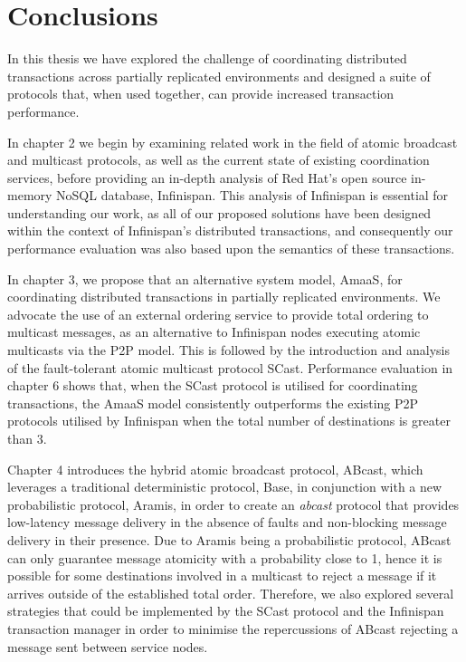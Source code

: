 \chapter{Conclusions}

    \graphicspath{{Chapter7-Conclusions/Figs/Vector/}{Chapter3-Conclusions/Figs/}}

In this thesis we have explored the challenge of coordinating distributed transactions across partially replicated environments and designed a suite of protocols that, when used together, can provide increased transaction performance. 

In chapter 2 we begin by examining related work in the field of atomic broadcast and multicast protocols, as well as the current state of existing coordination services, before providing an in-depth analysis of Red Hat's open source in-memory NoSQL database, Infinispan.  This analysis of Infinispan is essential for understanding our work, as all of our proposed solutions have been designed within the context of Infinispan's distributed transactions, and consequently our performance evaluation was also based upon the semantics of these transactions.  

In chapter 3, we propose that an alternative system model, \textsf{AmaaS}, for coordinating distributed transactions in partially replicated environments.  We advocate the use of an external ordering service to provide total ordering to multicast messages, as an alternative to Infinispan nodes executing atomic multicasts via the P2P model.  This is followed by the introduction and analysis of the fault-tolerant atomic multicast protocol \textsf{SCast}.  Performance evaluation in chapter 6 shows that, when the \textsf{SCast} protocol is utilised for coordinating transactions, the \textsf{AmaaS} model consistently outperforms the existing P2P protocols utilised by Infinispan when the total number of destinations is greater than 3.  

Chapter 4 introduces the hybrid atomic broadcast protocol, \textsf{ABcast}, which leverages a traditional deterministic protocol, \textsf{Base}, in conjunction with a new probabilistic protocol, \textsf{Aramis}, in order to create an \emph{abcast} protocol that provides low-latency message delivery in the absence of faults and non-blocking message delivery in their presence.  Due to \textsf{Aramis} being a probabilistic protocol, \textsf{ABcast} can only guarantee message atomicity with a probability close to 1, hence it is possible for some destinations involved in a multicast to reject a message if it arrives outside of the established total order.  Therefore, we also explored several strategies that could be implemented by the \textsf{SCast} protocol and the Infinispan transaction manager in order to minimise the repercussions of \textsf{ABcast} rejecting a message sent between service nodes. 

